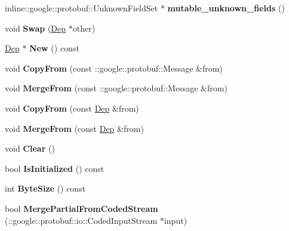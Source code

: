 \begin{DoxyCompactItemize}
\item 
\hypertarget{classDep_af6070821655e8abd2054d0248896ed71}{
inline::google::protobuf::UnknownFieldSet $\ast$ {\bfseries mutable\_\-unknown\_\-fields} ()}
\label{classDep_af6070821655e8abd2054d0248896ed71}

\item 
\hypertarget{classDep_a89fd3d7654cbf49a112ee30ebe30a8f4}{
void {\bfseries Swap} (\hyperlink{classDep}{Dep} $\ast$other)}
\label{classDep_a89fd3d7654cbf49a112ee30ebe30a8f4}

\item 
\hypertarget{classDep_add63de81fa6478b899aff7ae37b8dff1}{
\hyperlink{classDep}{Dep} $\ast$ {\bfseries New} () const }
\label{classDep_add63de81fa6478b899aff7ae37b8dff1}

\item 
\hypertarget{classDep_a26c81c96d8bc499af3e3190127ae4f14}{
void {\bfseries CopyFrom} (const ::google::protobuf::Message \&from)}
\label{classDep_a26c81c96d8bc499af3e3190127ae4f14}

\item 
\hypertarget{classDep_a8521cee2d2c20cc3374caee792879d24}{
void {\bfseries MergeFrom} (const ::google::protobuf::Message \&from)}
\label{classDep_a8521cee2d2c20cc3374caee792879d24}

\item 
\hypertarget{classDep_a9c5e702a5cafd5a8bdf72ef36d754d27}{
void {\bfseries CopyFrom} (const \hyperlink{classDep}{Dep} \&from)}
\label{classDep_a9c5e702a5cafd5a8bdf72ef36d754d27}

\item 
\hypertarget{classDep_ad104b852e4e4e46eaa50d376b19fe83d}{
void {\bfseries MergeFrom} (const \hyperlink{classDep}{Dep} \&from)}
\label{classDep_ad104b852e4e4e46eaa50d376b19fe83d}

\item 
\hypertarget{classDep_a1713906a00ff37953c363bdbc07cbd54}{
void {\bfseries Clear} ()}
\label{classDep_a1713906a00ff37953c363bdbc07cbd54}

\item 
\hypertarget{classDep_ae39f86aae19b958824fd94b0092e07c9}{
bool {\bfseries IsInitialized} () const }
\label{classDep_ae39f86aae19b958824fd94b0092e07c9}

\item 
\hypertarget{classDep_af27fc8c7ab40a5ad63e3908db600fc5c}{
int {\bfseries ByteSize} () const }
\label{classDep_af27fc8c7ab40a5ad63e3908db600fc5c}

\item 
\hypertarget{classDep_a2080b72b2b01ff368d85506bfc311e28}{
bool {\bfseries MergePartialFromCodedStream} (::google::protobuf::io::CodedInputStream $\ast$input)}
\label{classDep_a2080b72b2b01ff368d85506bfc311e28}


\end{DoxyCompactItemize}

